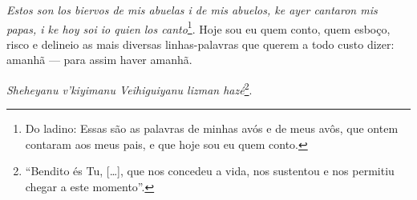 \emph{Estos son los biervos de mis abuelas i de mis abuelos, ke ayer
cantaron mis papas, i ke hoy soi io quien los canto}\footnote{Do
  ladino: Essas são as palavras de minhas avós e de meus avôs,
  que ontem contaram aos meus pais, e que hoje sou eu quem conto.}. Hoje
sou eu quem conto, quem esboço, risco e delineio as mais diversas
linhas-palavras que querem a todo custo dizer: amanhã --- para assim
haver amanhã.


\noindent{}\emph{Sheheyanu v'kiyimanu Veihiguiyanu lizman hazé}\footnote{``Bendito
  és Tu, {[}\ldots{}{]}, que nos concedeu a vida, nos sustentou e nos
  permitiu chegar a este momento''.}.
